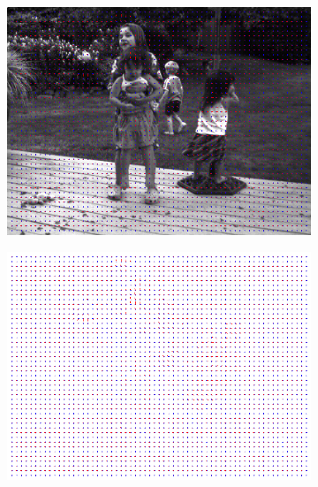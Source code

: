 \documentclass[a4paper,11]{article}
\begin{document}
    
    \begin{figure}[H]\ContinuedFloat
  \begin{subfigure}{0.5\textwidth}
   \centering
   \includegraphics[width=0.8\linewidth]{Backyard/result_31x31.png}
   \end{subfigure}
   \begin{subfigure}{0.5\textwidth}
    \centering
    \includegraphics[width=0.8\linewidth]{Backyard/flow_31x31.png}
   \end{subfigure}
     \vspace{1em}
   

\end{figure}
\end{document}
